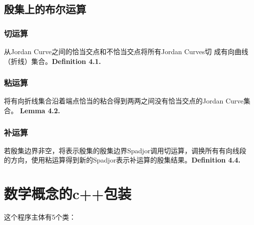 \documentclass[a4paper]{book}
\numberwithin{equation}{chapter}
\theoremstyle{definition}
\begin{document}
\subsection{殷集上的布尔运算}
\subsubsection{切运算}	
从Jordan Curve之间的恰当交点和不恰当交点将所有Jordan Curves切
成有向曲线（折线）集合。\textbf{Definition 4.1.}
\subsubsection{粘运算}
将有向折线集合沿着端点恰当的粘合得到两两之间没有恰当交点的Jordan Curve集合。
\textbf{Lemma 4.2.}
\subsubsection{补运算}
若殷集边界非空，将表示殷集的殷集边界Spadjor调用切运算，调换所有有向线段
的方向，使用粘运算得到新的Spadjor表示补运算的殷集结果。\textbf{Definition 4.4.}




\section{\heiti 数学概念的c++包装}

这个程序主体有5个类：
\end{document}
